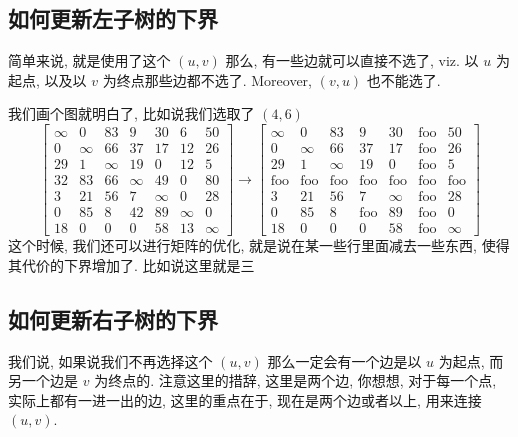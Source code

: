 \documentclass[a4paper, 10pt]{ctexart} %
\begin{document}
\subsection{如何更新左子树的下界} %
\label{sub:如何更新左子树的下界}
简单来说, 就是使用了这个 $\left( u ,v\right) $ 那么, 有一些边就可以直接不选了, viz. 
以 $u$ 为起点, 以及以 $v$ 为终点那些边都不选了. Moreover, $\left( v, u\right)$ 也不能选了.

我们画个图就明白了, 比如说我们选取了 $\left( 4 , 6\right)$
\[
\begin{bmatrix}
    \infty & 0 & 83 & 9 & 30 & 6 & 50 \\
    0 & \infty & 66 & 37 & 17 & 12 & 26 \\
    29 & 1 & \infty & 19 & 0 & 12 & 5\\
    32 & 83 & 66 & \infty & 49 & 0 & 80 \\
    3 & 21 & 56 &  7 & \infty &  0& 28\\
    0 & 85 & 8 & 42 & 89 & \infty & 0\\
    18 & 0 & 0 & 0 & 58 & 13 & \infty 
\end{bmatrix}\rightarrow
\begin{bmatrix}
    \infty & 0 & 83 & 9 & 30 & \text{foo}  & 50 \\
    0 & \infty & 66 & 37 & 17 &\text{foo} & 26 \\
    29 & 1 & \infty & 19 & 0 &\text{foo}& 5\\
    \text{foo} & \text{foo} & \text{foo} & \text{foo} &\text{foo} &\text{foo}  &\text{foo} \\
    3 & 21 & 56 &  7 & \infty &  \text{foo}& 28\\
    0 & 85 & 8 & \text{foo} & 89 &\text{foo}& 0\\
    18 & 0 & 0 & 0 & 58 &\text{foo}& \infty 
\end{bmatrix}
\]
这个时候, 我们还可以进行矩阵的优化, 就是说在某一些行里面减去一些东西, 使得其代价的下界增加了. 比如说这里就是三
\subsection{如何更新右子树的下界} %
\label{sub:如何更新右子树的下界}
我们说, 如果说我们不再选择这个 $ \left( u , v\right)$ 那么一定会有一个边是以 $u$ 为起点, 而另一个边是 $v$ 为终点的.
注意这里的措辞, 这里是两个边, 你想想, 对于每一个点, 实际上都有一进一出的边, 
这里的重点在于, 现在是两个边或者以上, 用来连接 $\left( u , v\right)$. 
\end{document}

